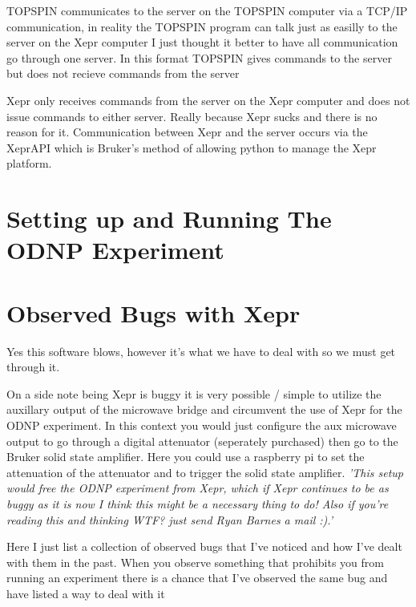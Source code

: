 \documentclass{article}
\newcommand{\fc}[1]{{\color{blue}\textit{'{#1}'}}}
\begin{document}
TOPSPIN communicates to the server on the TOPSPIN computer via a TCP/IP communication, in reality the TOPSPIN program can talk just as easilly to the server on the Xepr computer I just thought it better to have all communication go through one server. In this format TOPSPIN gives commands to the server but does not recieve commands from the server

Xepr only receives commands from the server on the Xepr computer and does not issue commands to either server. Really because Xepr sucks and there is no reason for it. Communication between Xepr and the server occurs via the XeprAPI which is Bruker's method of allowing python to manage the Xepr platform.




\section{Setting up and Running The ODNP Experiment}
\label{sec:runningODNP}



\section{Observed Bugs with Xepr}
Yes this software blows, however it's what we have to deal with so we must get through it.

On a side note being Xepr is buggy it is very possible / simple to utilize the auxillary output of the microwave bridge and circumvent the use of Xepr for the ODNP experiment. In this context you would just configure the aux microwave output to go through a digital attenuator (seperately purchased) then go to the Bruker solid state amplifier. Here you could use a raspberry pi to set the attenuation of the attenuator and to trigger the solid state amplifier. \fc{This setup would free the ODNP experiment from Xepr, which if Xepr continues to be as buggy as it is now I think this might be a necessary thing to do! Also if you're reading this and thinking WTF? just send Ryan Barnes a mail :).}

Here I just list a collection of observed bugs that I've noticed and how I've dealt with them in the past. When you observe something that prohibits you from running an experiment there is a chance that I've observed the same bug and have listed a way to deal with it 
\end{document}
